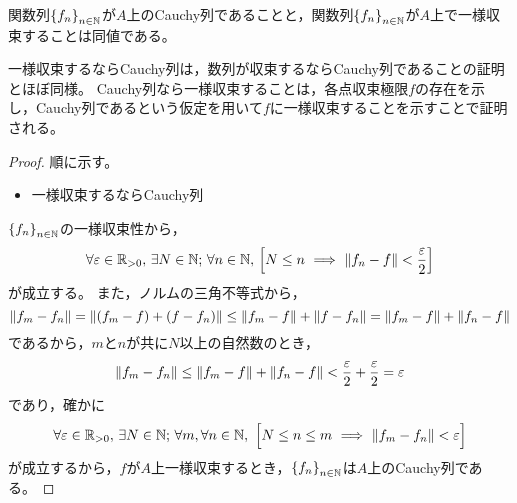 \documentclass[b5paper,draft]{ltjsbook}
\begin{document}
\begin{thm}[一様収束性とCauchy列の同値性]
    関数列$\seq{f_n}{n\in\N}$が$A$上のCauchy列であることと，関数列$\seq{f_n}{n\in\N}$が$A$上で一様収束することは同値である。
    \begin{policy}
        一様収束するならCauchy列は，数列が収束するならCauchy列であることの証明とほぼ同様。
        Cauchy列なら一様収束することは，各点収束極限$f$の存在を示し，Cauchy列であるという仮定を用いて$f$に一様収束することを示すことで証明される。
    \end{policy}
    \begin{proof}
        順に示す。
        \begin{itemize}
            \item 一様収束するならCauchy列
        \end{itemize}
        $\seq{f_n}{n\in\N}$の一様収束性から，
        \begin{equation}
            \forall\varepsilon\in\Rposi,\,\exists N\in\N;\, \forall n\in\N,\, \squ{
                N\leq n\ \Longrightarrow\ \norm{f_n-f}<\frac{\varepsilon}{2}
            }
        \end{equation}
        が成立する。
        また，ノルムの三角不等式から，
        \begin{equation}
            \norm{f_m-f_n}=\norm{\pare{f_m - f} + \pare{f-f_n}}\leq \norm{f_m-f}+\norm{f-f_n}=\norm{f_m-f}+\norm{f_n-f}
        \end{equation}
        であるから，$m$と$n$が共に$N$以上の自然数のとき，
        \begin{equation}
            \norm{f_m-f_n}\leq \norm{f_m-f}+\norm{f_n-f} <\frac{\varepsilon}{2}+\frac{\varepsilon}{2}=\varepsilon
        \end{equation}
        であり，確かに
        \begin{equation}
            \forall\varepsilon\in\Rposi,\,\exists N\in\N;\, \forall m,\forall n\in\N,\ \bsqu{
                N\leq n\leq m\ \Longrightarrow\ \norm{f_m-f_n}<\varepsilon
            }
        \end{equation}
        が成立するから，$f$が$A$上一様収束するとき，$\seq{f_n}{n\in\N}$は$A$上のCauchy列である。


\end{proof}
\end{thm}
\end{document}
